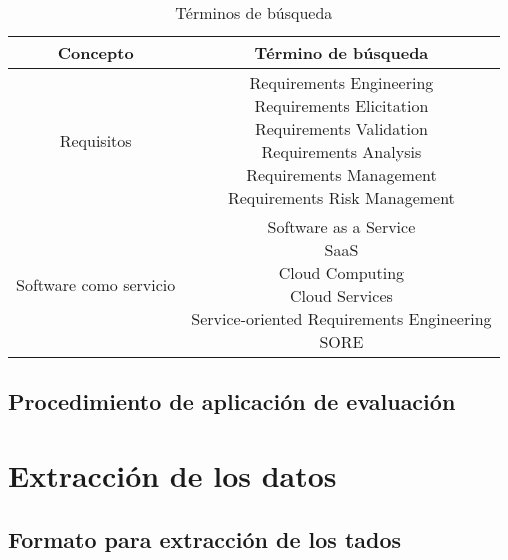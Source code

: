 \documentclass{article}
\begin{document}
\begin{table}[ht]
        \caption{Términos de búsqueda} 
        \centering %
        \begin{tabular}{c c}
                \hline
                Concepto & Término de búsqueda\\ [0.5ex] %
                \hline %
                Requisitos             & \makecell{Requirements Engineering \\
                                                   Requirements Elicitation \\
                                                   Requirements Validation \\
                                                   Requirements Analysis \\
                                                   Requirements Management \\
                                                   Requirements Risk Management} \\ 
                \hline %
                Software como servicio & \makecell{Software as a Service \\
                                                   SaaS \\
                                                   Cloud Computing \\
                                                   Cloud Services\\
                                                   Service-oriented Requirements Engineering \\
                                                   SORE } \\[1ex] 
                \hline 
        \end{tabular}
        \label{table:tablaterminos} %
\end{table}

\subsection{Procedimiento de aplicación de evaluación}
\section{Extracción de los datos}
\subsection{Formato para extracción de los tados}
\end{document}
